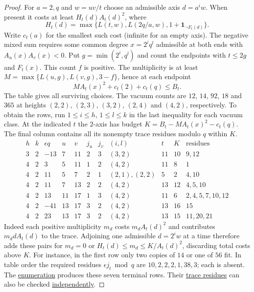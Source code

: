 \documentclass[11pt,a4paper]{article}
\numberwithin{equation}{section}
\theoremstyle{remark}
\begin{document}
\begin{proof}
For $a=2,q$ and $w=uv/t$ choose an admissible axis $d=a^i w$.
When present it costs at least $H_t(d)A_t(d)^2$, where
\[
 H_t(d)=\max\{L(t,w),L(2q/a,w),1+\mathbf1_{\neg F_t(d)}\}.
\]
Write $c_t(a)$ for the smallest such cost (infinite for an empty axis).
The negative mixed sum requires some common degree $x=2^i q^l$
admissible at both ends with $A_u(x)A_v(x)<0$.
Put $g=\min(2^i,q^l)$ and count the endpoints with $t\le2g$ and $F_t(x)$.
This count $f$ is positive. The multiplicity is at least
$M=\max\{L(u,g),L(v,g),3-f\}$, hence at each endpoint
\[
  M A_t(x)^2+c_t(2)+c_t(q)\le B_t.
\]
The table gives all surviving choices. The vacuum counts are $12$, $14$, $92$, $18$ and $365$
at heights $(2,2)$, $(2,3)$, $(3,2)$, $(2,4)$ and $(4,2)$, respectively. To obtain the rows, run $1\le i\le h$, $1\le l\le k$
in the last inequality for each vacuum class. At the indicated $t$
the $2$-axis has budget $K=B_t-MA_t(x)^2-c_t(q)$. The final column
contains all its nonempty trace residues modulo $q$ within $K$.
\[
\begin{array}{cc|rrr|rr|c|rr|l}
h&k&\epsilon q&u&v&j_u&j_v&(i,l)&t&K&\text{residues}\\\hline
3&2&-13&7&11&2&3&(3,2)&11&10&9,12\\
4&2&3&5&11&1&2&(4,2)&11&8&1\\
4&2&11&5&7&2&1&(2,1),(2,2)&5&2&4,10\\
4&2&11&7&13&2&2&(4,2)&13&12&4,5,10\\
4&2&13&11&17&1&3&(4,2)&11&6&2,4,5,7,10,12\\
4&2&-41&13&17&3&2&(4,2)&13&16&15\\
4&2&23&13&17&3&2&(4,2)&13&15&11,20,21
\end{array}
\]
Indeed each positive multiplicity $m_d$ costs $m_d A_t(d)^2$ and contributes
$m_d d A_t(d)$ to the trace. Adjoining one admissible $d=2^i w$ at a time
therefore adds these pairs for $m_d=0$ or $H_t(d)\le m_d\le K/A_t(d)^2$,
discarding total costs above $K$. For instance, in the first row only two
copies of $14$ or one of $56$ fit. In table order the required residues
$\epsilon j_t\bmod q$ are $10,2,2,2,1,38,3$; each is absent. The \href{https://github.com/sebastienpalcoux/WGT-fusion-categories/blob/f7f9f9a02f3116e61eb9dca4eebfed77001494e8/code/four_primes/dyadic_total_height.py}{enumeration} produces these seven terminal rows. Their \href{https://github.com/sebastienpalcoux/WGT-fusion-categories/blob/f7f9f9a02f3116e61eb9dca4eebfed77001494e8/certificates/certificates.json}{trace residues} can also be checked \href{https://github.com/sebastienpalcoux/WGT-fusion-categories/blob/f7f9f9a02f3116e61eb9dca4eebfed77001494e8/code/verify_witnesses.py}{independently}.
\end{proof}
\end{document}

